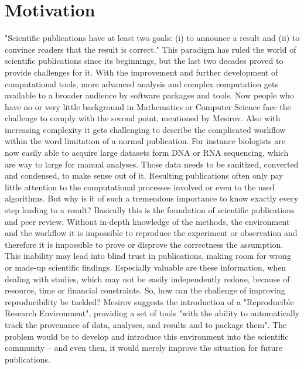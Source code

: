 \section{Motivation}
"Scientific publications have at least two goals: (i) to announce a result and (ii) to convince readers that the result is correct." \cite{Mesirov2010}
This paradigm has ruled the world of scientific publications since its beginnings, but the last two decades proved to provide challenges for it. With the improvement and further development of computational tools, more advanced analysis and complex computation gets available to a broader audience by software packages and tools. Now people who have no or very little background in Mathematics or Computer Science face the challenge to comply with the second point, mentioned by Mesirov. Also with increasing complexity it gets challenging to describe the complicated workflow within the word limitation of a normal publication.
For instance biologists are now easily able to acquire large datasets form DNA or RNA sequencing, which are way to large for manual analyses. Those data needs to be sanitized, converted and condensed, to make sense out of it. Resulting publications often only pay little attention to the computational processes involved or even to the used algorithms. \cite{Peng2011} 
But why is it of such a tremendous importance to know exactly every step leading to a result? Basically this is the foundation of scientific publications and peer review. Without in-depth knowledge of the methods, the environment and the workflow it is impossible to reproduce the experiment or observation and therefore it is impossible to prove or disprove the correctness the assumption. This inability may lead into blind trust in publications, making room for wrong or made-up scientific findings.
Especially valuable are these information, when dealing with studies, which may not be easily independently redone, because of resource, time or financial constraints. \cite{Peng2011}
So, how can the challenge of improving reproducibility be tackled? Mesirov \cite{Mesirov2010} suggests the introduction of a "Reproducible Research Environment", providing a set of tools "with the ability to automatically track the provenance of data, analyses, and results and to package them".
The problem would be to develop and introduce this environment into the scientific community -- and even then, it would merely improve the situation for future publications.

